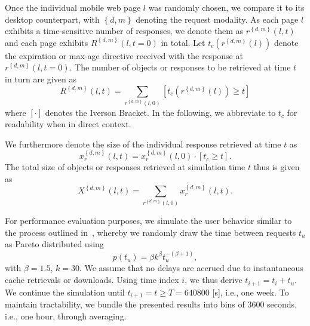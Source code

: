 \documentclass[letterpaper,conference]{IEEEtran}
\begin{document}
Once the individual mobile web page $l$ was randomly chosen, we compare it to its desktop counterpart, with $\left\{ d,m \right\}$ denoting the request modality.
As each page $l$ exhibits a time-sensitive number of responses, we denote them as $r^{\left\{ d,m \right\}}(l,t)$ and each page exhibits $R^{\left\{ d,m \right\}}(l,t=0)$ in total.
Let $t_c(r^{\left\{ d,m \right\}}(l))$ denote the expiration or max-age directive received with the response at $r^{\left\{ d,m \right\}}(l,t=0)$.
The number of objects or responses to be retrieved at time $t$ in turn are given as 
\begin{equation}
R^{\left\{ d,m \right\}}(l,t) = \sum_{r^{\left\{ d,m \right\}}(l,0)} \left[ t_c(r^{\left\{ d,m \right\}}(l)) \ge t \right]
\end{equation}
where $\left[ \cdot \right] $ denotes the Iverson Bracket.
In the following, we abbreviate to $t_c$ for readability when in direct context.

We furthermore denote the size of the individual response retrieved at time $t$ as 
\begin{equation}
x_{r}^{\left\{ d,m \right\}}(l,t) = x_{r}^{\left\{ d,m \right\}}(l,0) \cdot \left[ t_c \ge t \right].
\end{equation}
The total size of objects or responses retrieved at simulation time $t$ thus is given as 
\begin{equation}
X^{\left\{ d,m \right\}}(l,t) =\sum_{r^{\left\{ d,m \right\}}(l,0)} x_{r}^{\left\{ d,m \right\}}(l,t).
\end{equation}


For performance evaluation purposes, we simulate the user behavior similar to the process outlined in~\cite{AnCoGrPa03}, whereby we randomly draw the time between requests $t_u$ as Pareto distributed using
\begin{equation}
p(t_u)=\beta k^\beta t_u^{-(\beta+1)},
\end{equation}
 with $\beta=1.5$, $k=30$.
We assume that no delays are accrued due to instantaneous cache retrievals or downloads. 
Using time index $i$, we thus derive $t_{i+1}=t_i + t_u$.
We continue the simulation until $t_{i+1} = t \ge T =  640800$ [s], i.e., one week.
To maintain tractability, we bundle the presented results into bins of 3600 seconds, i.e., one hour, through averaging.


%
%
%
\end{document}
